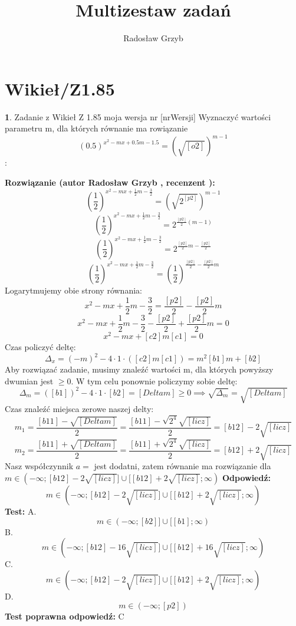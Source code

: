 \documentclass[12pt, a4paper]{article}
\title{Multizestaw zadań}
\author{Radosław Grzyb}
\date{}
\theoremstyle{definition} %
\newtheorem{zad}{}
\newcommand{\kategoria}[1]{\section{#1}} %
\newcommand{\zadStart}[1]{\begin{zad}#1\newline} %
\newcommand{\zadStop}{\end{zad}}   %
\newcommand{\rozwStart}[2]{\noindent \textbf{Rozwiązanie (autor #1 , recenzent #2): }\newline} %
\newcommand{\rozwStop}{\newline}                                            %
\newcommand{\odpStart}{\noindent \textbf{Odpowiedź:}\newline}    %
\newcommand{\odpStop}{\newline}                                             %
\newcommand{\testStart}{\noindent \textbf{Test:}\newline} %
\newcommand{\testStop}{\newline} %
\newcommand{\kluczStart}{\noindent \textbf{Test poprawna odpowiedź:}\newline} %
\newcommand{\kluczStop}{\newline} %
\begin{document}
\maketitle
\kategoria{Wikieł/Z1.85}
\zadStart{Zadanie z Wikieł Z 1.85 moja wersja nr [nrWersji]}
Wyznaczyć wartości parametru m, dla których równanie ma rowiązanie 
$$(0.5)^{x^{2}-mx+0.5m-1.5}=(\sqrt{[o2]})^{m-1}$$:
\zadStop
\rozwStart{Radosław Grzyb}{}
$$(\frac{1}{2})^{x^{2}-mx+\frac{1}{2}m-\frac{3}{2}}=(\sqrt{2^{[p2]}})^{m-1}$$
$$(\frac{1}{2})^{x^{2}-mx+\frac{1}{2}m-\frac{3}{2}}=2^{\frac{[p2]}{2}(m-1)}$$
$$(\frac{1}{2})^{x^{2}-mx+\frac{1}{2}m-\frac{3}{2}}=2^{\frac{[p2]}{2}m-\frac{[p2]}{2}}$$
$$(\frac{1}{2})^{x^{2}-mx+\frac{1}{2}m-\frac{3}{2}}=(\frac{1}{2})^{\frac{[p2]}{2}-\frac{[p2]}{2}m}$$
Logarytmujemy obie strony równania:
$$x^{2}-mx+\frac{1}{2}m-\frac{3}{2}=\frac{[p2]}{2}-\frac{[p2]}{2}m$$
$$x^{2}-mx+\frac{1}{2}m-\frac{3}{2}-\frac{[p2]}{2}+\frac{[p2]}{2}m=0$$
$$x^{2}-mx+[c2]m[c1]=0$$
Czas policzyć deltę:
$$\Delta_{x}=(-m)^{2}-4\cdot1\cdot([c2]m[c1])=m^{2}[b1]m+[b2]$$
Aby rozwiązać zadanie, musimy znaleźć wartości m, dla których powyższy dwumian jest $\geq0$. W tym celu ponownie policzymy sobie deltę:
$$\Delta_{m}=([b1])^{2}-4\cdot1\cdot[b2]=[Deltam]\geq0\implies\sqrt{\Delta_{m}}=\sqrt{[Deltam]}$$
Czas znaleźć miejsca zerowe naszej delty:
$$m_{1}=\frac{[b11]-\sqrt{[Deltam]}}{2}=\frac{[b11]-\sqrt{2^4}\sqrt{[licz]}}{2}=[b12]-2\sqrt{[licz]}$$
$$m_{2}=\frac{[b11]+\sqrt{[Deltam]}}{2}=\frac{[b11]+\sqrt{2^4}\sqrt{[licz]}}{2}=[b12]+2\sqrt{[licz]}$$
Nasz współczynnik $a=$ jest dodatni, zatem równanie ma rozwiązanie dla\\ $m\in(-\infty;[b12]-2\sqrt{[licz]}]\cup[[b12]+2\sqrt{[licz]};\infty)$
\rozwStop
\odpStart
$$m\in(-\infty;[b12]-2\sqrt{[licz]}]\cup[[b12]+2\sqrt{[licz]};\infty)$$
\odpStop
\testStart
A.$$m\in(-\infty;[b2]]\cup[[b1];\infty)$$
B.$$m\in(-\infty;[b12]-16\sqrt{[licz]}]\cup[[b12]+16\sqrt{[licz]};\infty)$$
C.$$m\in(-\infty;[b12]-2\sqrt{[licz]}]\cup[[b12]+2\sqrt{[licz]};\infty)$$
D.$$m\in(-\infty;[p2])$$
\testStop
\kluczStart
C
\kluczStop
\end{document}
